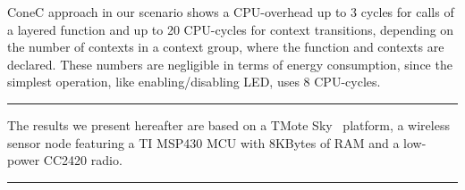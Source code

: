 
ConeC approach in our scenario shows a CPU-overhead up to 3 cycles for calls of
a layered function and up to 20 CPU-cycles for context transitions, depending on
the number of contexts in a context group, where the function and contexts are
declared. These numbers are negligible in terms of energy consumption, since the
simplest operation, like enabling/disabling LED, uses 8 CPU-cycles.

\hrule
The results we present hereafter are based on a TMote
Sky~\cite{} platform, a wireless sensor node featuring a TI MSP430 MCU
with 8KBytes of RAM and a low-power CC2420 radio.
\hrule

